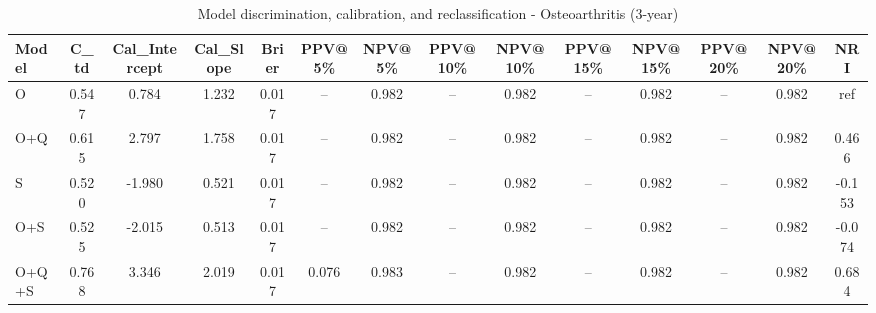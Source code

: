 \begin{table}[htbp]
\centering
\small
\caption{Model discrimination, calibration, and reclassification - Osteoarthritis (3-year)}
\label{tab:perf_osteoarthritis_3y}
\begin{tabular}{lccccccccccccc}
\toprule
Model & C\_td & Cal\_Intercept & Cal\_Slope & Brier & PPV@5\% & NPV@5\% & PPV@10\% & NPV@10\% & PPV@15\% & NPV@15\% & PPV@20\% & NPV@20\% & NRI \\
\midrule
O & 0.547 & 0.784 & 1.232 & 0.017 & -- & 0.982 & -- & 0.982 & -- & 0.982 & -- & 0.982 & ref \\
O+Q & 0.615 & 2.797 & 1.758 & 0.017 & -- & 0.982 & -- & 0.982 & -- & 0.982 & -- & 0.982 & 0.466 \\
S & 0.520 & -1.980 & 0.521 & 0.017 & -- & 0.982 & -- & 0.982 & -- & 0.982 & -- & 0.982 & -0.153 \\
O+S & 0.525 & -2.015 & 0.513 & 0.017 & -- & 0.982 & -- & 0.982 & -- & 0.982 & -- & 0.982 & -0.074 \\
O+Q+S & 0.768 & 3.346 & 2.019 & 0.017 & 0.076 & 0.983 & -- & 0.982 & -- & 0.982 & -- & 0.982 & 0.684 \\
\bottomrule
\end{tabular}
\end{table}